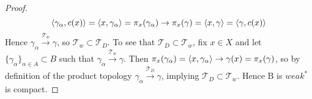\begin{thm}
\begin{proof}
        \begin{equation}
            \left\langle \gamma_{\alpha}, c(x) \right\rangle= \left\langle x,\gamma_\alpha \right\rangle = \pi_x(\gamma_\alpha) \to \pi_x(\gamma) = \left\langle x,\gamma \right\rangle = \left\langle \gamma, c(x) \right\rangle
        \end{equation}
        Hence $\gamma_\alpha \overset{\mathcal{T}_w}{\to} \gamma$, so $\mathcal{T}_w \subset \mathcal{T}_D$.  
        To see that $\mathcal{T}_D \subset \mathcal{T}_w$, fix $x\in X$ and let $\{\gamma_\alpha\}_{\alpha \in A} \subset B$ such that $\gamma_\alpha \overset{\mathcal{T}_w}{\to} \gamma$. 
        Then $\pi_x(\gamma_\alpha) = \left\langle x,\gamma_\alpha \right\rangle \to \gamma(x) = \pi_x(\gamma)$, so by definition of the product topology $\gamma_\alpha \overset{\mathcal{T}_D}{\to} \gamma$, implying $\mathcal{T}_D \subset \mathcal{T}_w$.  Hence B is $weak^{*}$ is compact. 
    \end{proof}
\end{thm} 


